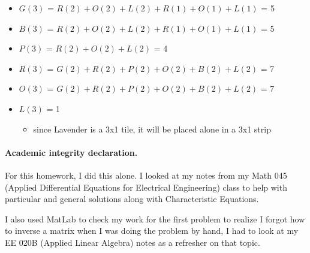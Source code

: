 \documentclass[11pt]{article}
\newcounter{prnum}
\newenvironment{problem}{{\vskip 0.2in\noindent\bf Problem
       \addtocounter{prnum}{1} \arabic{prnum}.}}{\vskip 0.1in}
\begin{document}
\begin{problem}
\begin{enumerate}
\begin{enumerate}
        \begin{itemize}
          \item $G(3)$ = $R(2) + O(2) + L(2) + R(1) + O(1) + L(1)$ = 5
          \item $B(3)$ = $R(2) + O(2) + L(2) + R(1) + O(1) + L(1)$ = 5
          \item $P(3)$ = $R(2) + O(2) + L(2)$ = 4
          \item $R(3)$ = $G(2) + R(2) + P(2) + O(2) + B(2) + L(2)$ = 7
          \item $O(3)$ = $G(2) + R(2) + P(2) + O(2) + B(2) + L(2)$ = 7
          \item $L(3)$ = 1
            \begin{itemize}
              \item since Lavender is a 3x1 tile, it will be placed alone in a 3x1 strip
            \end{itemize}
    \end{itemize}
      
    \end{enumerate}
\end{enumerate}

\end{problem}
  


\vskip 0.2in
\paragraph{Academic integrity declaration.}

For this homework, I did this alone. I looked at my notes from my 
Math 045 (Applied Differential Equations for Electrical Engineering) class
to help with particular and general solutions along with Characteristic Equations.

I also used MatLab to check my work for the first problem to realize I forgot how to inverse a matrix
when I was doing the problem by hand, I had to look at my EE 020B (Applied Linear Algebra) 
notes as a refresher on that topic.
\end{document}
